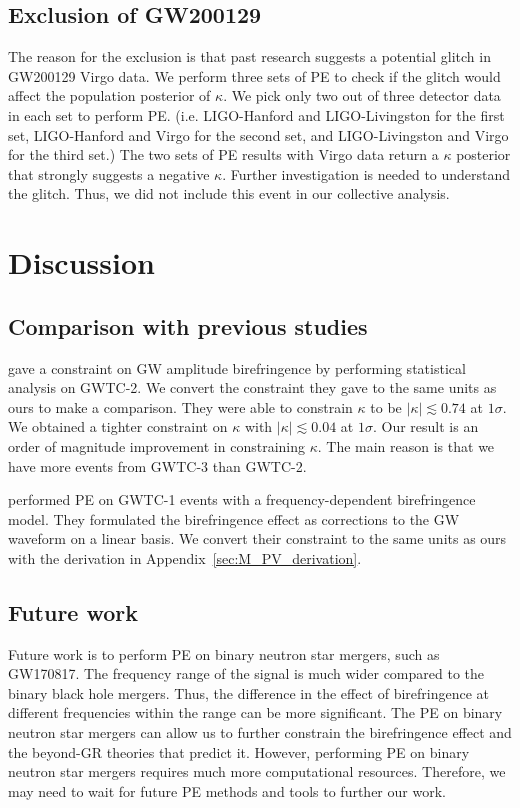 \documentclass[aps,prd,twocolumn,superscriptaddress,preprintnumbers,floatfix,nofootinbib]{revtex4-2}
\begin{document}
\subsection{Exclusion of GW200129}
\label{sec:GW200129}
The reason for the exclusion is that past research suggests a potential glitch in GW200129 Virgo data. \citep{GW200129_glitch}
We perform three sets of PE to check if the glitch would affect the population posterior of $\kappa$.
We pick only two out of three detector data in each set to perform PE. (i.e. LIGO-Hanford and LIGO-Livingston for the first set, LIGO-Hanford and Virgo for the second set, and LIGO-Livingston and Virgo for the third set.)
The two sets of PE results with Virgo data return a $\kappa$ posterior that strongly suggests a negative $\kappa$.
Further investigation is needed to understand the glitch.
Thus, we did not include this event in our collective analysis.

\section{Discussion}
\label{sec:Discussion}

\subsection{Comparison with previous studies}
\citet{Okounkova_2022} gave a constraint on GW amplitude birefringence by performing statistical analysis on GWTC-2.
We convert the constraint they gave to the same units as ours to make a comparison.
They were able to constrain $\kappa$ to be $|\kappa| \lesssim 0.74$ at $1 \sigma$.
We obtained a tighter constraint on $\kappa$ with $|\kappa| \lesssim 0.04$ at $1 \sigma$.
Our result is an order of magnitude improvement in constraining $\kappa$.
The main reason is that we have more events from GWTC-3 than GWTC-2.

\citet{Wang_2021} performed PE on GWTC-1 events with a frequency-dependent birefringence model.
They formulated the birefringence effect as corrections to the GW waveform on a linear basis.
We convert their constraint to the same units as ours with the derivation in Appendix~\ref{sec:M_PV_derivation}.

\subsection{Future work}
Future work is to perform PE on binary neutron star mergers, such as GW170817.
The frequency range of the signal is much wider compared to the binary black hole mergers.
Thus, the difference in the effect of birefringence at different frequencies within the range can be more significant.
The PE on binary neutron star mergers can allow us to further constrain the birefringence effect and the beyond-GR theories that predict it.
However, performing PE on binary neutron star mergers requires much more computational resources.
Therefore, we may need to wait for future PE methods and tools to further our work.
\end{document}
